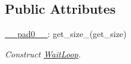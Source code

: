 \subsection*{Public Attributes}
\begin{DoxyCompactItemize}
\item 
\hypertarget{classop_1_1WaitLoop_a94f0800799cc0ffc3db304e5b97ed709}{\hyperlink{classop_1_1WaitLoop_a94f0800799cc0ffc3db304e5b97ed709}{\-\_\-\-\_\-pad0\-\_\-\-\_\-}\-: get\-\_\-size\-\_\-(get\-\_\-size)}\label{classop_1_1WaitLoop_a94f0800799cc0ffc3db304e5b97ed709}

\begin{DoxyCompactList}\small\item\em Construct \hyperlink{classop_1_1WaitLoop}{Wait\-Loop}. \end{DoxyCompactList}\end{DoxyCompactItemize}

